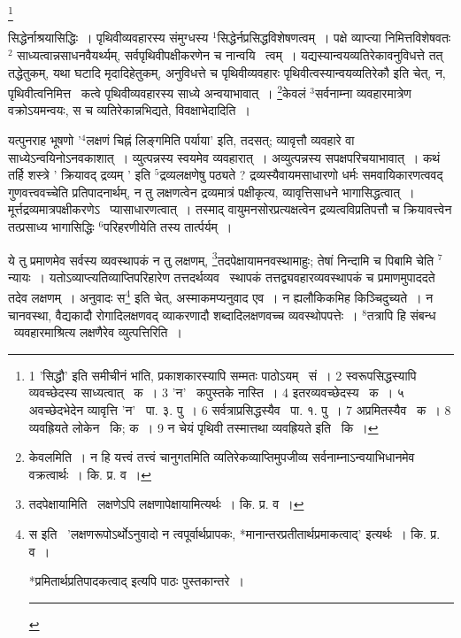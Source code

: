 \documentclass[11pt, openany]{book}
\newcommand\blfootnote[1]{%
 \begingroup
 \renewcommand\thefootnote{}\footnote{#1}%
 \addtocounter{footnote}{-1}%
 \endgroup
}
\begin{document}
\blfootnote{1 'सिद्धौ' इति समीचीनं भांति, प्रकाशकारस्यापि सम्मतः पाठोऽयम्  \textendash\ सं~। 2 स्वरूपसिद्धस्यापि व्यवच्छेदस्य साध्यत्वात्  \textendash\ क~। 3 'न'  \textendash\ कपुस्तके नास्ति~। 4 इतरव्यवच्छेदस्य  \textendash\ क~। ५ अवच्छेदभेदेन व्यावृत्ति 'न'  \textendash\ पा. ३. पु~। 6 सर्वत्राप्रसिद्धस्यैव  \textendash\ पा. १. पु~। 7 अप्रमितस्यैव  \textendash\ क~। 8 व्यवह्रियते लोकेन  \textendash\ कि; क~। 9 न चेयं पृथिवी तस्मात्तथा व्यवह्रियते इति  \textendash\ कि~।}

\newpage
\noindent
सिद्धेर्नाश्रयासिद्धिः~। पृथिवीव्यवहारस्य संमुग्धस्य ${}^1$सिद्धेर्नप्रसिद्धविशेषणत्वम्~। पक्षे व्याप्त्या निमित्तविशेषवतः$^2$ साध्यत्वान्नसाधनवैयर्थ्यम्, सर्वपृथिवीपक्षीकरणेन च नान्वयि \textendash\ त्वम्~। यद्यस्यान्वयव्यतिरेकावनुविधत्ते तत् तद्धेतुकम्, यथा घटादि मृदादिहेतुकम्, अनुविधत्ते च पृथिवीव्यवहारः पृथिवीत्वस्यान्वयव्यतिरेकौ इति चेत्, न, पृथिवीत्वनिमित्त \textendash\ कत्वे पृथिवीव्यवहारस्य साध्ये अन्वयाभावात्~। \renewcommand{\thefootnote}{१}\footnote{केवलमिति~। न हि यत्त्वं तत्त्वं चानुगतमिति व्यतिरेकव्याप्तिमुपजीव्य सर्वनाम्नाऽन्वयाभिधानमेव वक्रत्वार्थः~। कि. प्र. व~।}केवलं ${}^3$सर्वनाम्ना व्यवहारमात्रेण वक्रोऽयमन्वयः, स च व्यतिरेकान्नभिद्यते, विवक्षाभेदादिति~।

यत्पुनराह {\knu भूषणो} '$^4$लक्षणं चिह्नं लिङ्गमिति पर्याया' इति, तदसत्; व्यावृत्तौ व्यवहारे वा साध्येऽन्वयिनोऽनवकाशात्~। व्युत्पन्नस्य स्वयमेव व्यवहारात्~। अव्युत्पन्नस्य सपक्षपरिचयाभावात्~। कथं तर्हि शस्त्रे ' क्रियावद् द्रव्यम् ' इति ${}^5$द्रव्यलक्षणेषु पठ्यते ? द्रव्यस्यैवायमसाधारणो धर्मः समवायिकारणत्ववद् गुणवत्त्ववच्चेति प्रतिपादनार्थम्, न तु लक्षणत्वेन द्रव्यमात्रं पक्षीकृत्य, व्यावृत्तिसाधने भागासिद्धत्वात्~। मूर्त्तद्रव्यमात्रपक्षीकरणेऽ \textendash\ प्यासाधारणत्वात्~। तस्माद् वायुमनसोरप्रत्यक्षत्वेन द्रव्यत्वविप्रतिपत्तौ च क्रियावत्त्वेन तत्प्रसाध्य भागासिद्धिः ${}^6$परिहरणीयेति तस्य तार्त्पर्यम्~।

ये तु प्रमाणमेव सर्वस्य व्यवस्थापकं न तु लक्षणम्, \renewcommand{\thefootnote}{२}\footnote{तदपेक्षायामिति \textendash\ लक्षणेऽपि लक्षणापेक्षायामित्यर्थः~। कि. प्र. व~।}तदपेक्षायामनवस्थामाहुः; तेषां निन्दामि च पिबामि चेति ${}^7$न्यायः~। यतोऽव्याप्त्यतिव्याप्तिपरिहारेण तत्तदर्थव्यव \textendash\ स्थापकं तत्तद्व्यवहारव्यवस्थापकं च प्रमाणमुपाददते तदेव लक्षणम्~। अनुवादः स\renewcommand{\thefootnote}{३}\footnote{स इति \textendash\ 'लक्षणरूपोऽर्थोऽनुवादो न त्वपूर्वार्थप्रापकः, *मानान्तरप्रतीतार्थप्रमाकत्वाद्' इत्यर्थः~। कि. प्र. व~।

*प्रमितार्थप्रतिपादकत्वाद् इत्यपि पाठः पुस्तकान्तरे~।\\ \rule{0.4\linewidth}{0.5pt}} इति चेत्, अस्माकमप्यनुवाद एव~। न ह्यलौकिकमिह किञ्चिदुच्यते~। न चानवस्था, वैद्यकादौ रोगादिलक्षणवद् व्याकरणादौ शब्दादिलक्षणवच्च व्यवस्थोपपत्तेः~। ${}^8$तत्रापि हि संबन्ध \textendash\ व्यवहारमाश्रित्य लक्षणैरेव व्युत्पत्तिरिति~।
\end{document}
